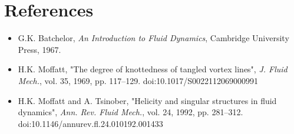 \documentclass[a4paper, aps,preprint,superscriptaddress, 12pt]{revtex4}
\begin{document}
    \section*{References}
    \begin{itemize}[leftmargin=1.5em]
        \item G.K. Batchelor, \textit{An Introduction to Fluid Dynamics}, Cambridge University Press, 1967.
        \item H.K. Moffatt, "The degree of knottedness of tangled vortex lines", \textit{J. Fluid Mech.}, vol. 35, 1969, pp. 117–129. doi:10.1017/S0022112069000991
        \item H.K. Moffatt and A. Tsinober, "Helicity and singular structures in fluid dynamics", \textit{Ann. Rev. Fluid Mech.}, vol. 24, 1992, pp. 281–312. doi:10.1146/annurev.fl.24.010192.001433
    \end{itemize}
\end{document}
